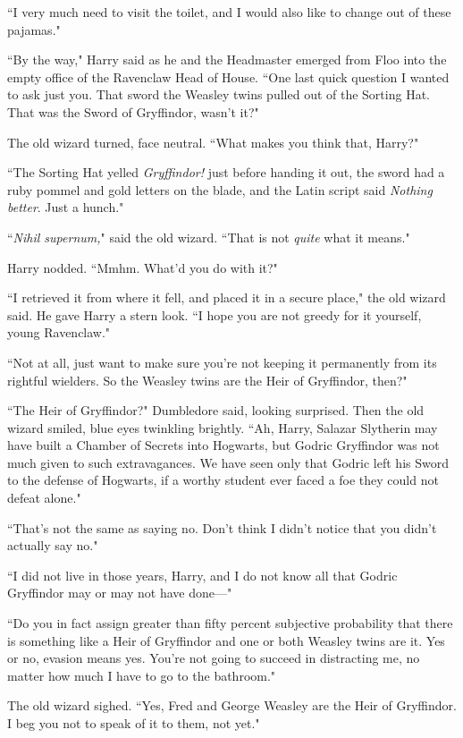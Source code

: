 ``I very much need to visit the toilet, and I would also like to change out of these pajamas."

\later

``By the way," Harry said as he and the Headmaster emerged from Floo into the empty office of the Ravenclaw Head of House. ``One last quick question I wanted to ask just you. That sword the Weasley twins pulled out of the Sorting Hat. That was the Sword of Gryffindor, wasn't it?"

The old wizard turned, face neutral. ``What makes you think that, Harry?"

``The Sorting Hat yelled \emph{Gryffindor!} just before handing it out, the sword had a ruby pommel and gold letters on the blade, and the Latin script said \emph{Nothing better}. Just a hunch."

``\emph{Nihil supernum,}" said the old wizard. ``That is not \emph{quite} what it means."

Harry nodded. ``Mmhm. What'd you do with it?"

``I retrieved it from where it fell, and placed it in a secure place," the old wizard said. He gave Harry a stern look. ``I hope you are not greedy for it yourself, young Ravenclaw."

``Not at all, just want to make sure you're not keeping it permanently from its rightful wielders. So the Weasley twins are the Heir of Gryffindor, then?"

``The Heir of Gryffindor?" Dumbledore said, looking surprised. Then the old wizard smiled, blue eyes twinkling brightly. ``Ah, Harry, Salazar Slytherin may have built a Chamber of Secrets into Hogwarts, but Godric Gryffindor was not much given to such extravagances. We have seen only that Godric left his Sword to the defense of Hogwarts, if a worthy student ever faced a foe they could not defeat alone."

``That's not the same as saying no. Don't think I didn't notice that you didn't actually say no."

``I did not live in those years, Harry, and I do not know all that Godric Gryffindor may or may not have done---"

``Do you in fact assign greater than fifty percent subjective probability that there is something like a Heir of Gryffindor and one or both Weasley twins are it. Yes or no, evasion means yes. You're not going to succeed in distracting me, no matter how much I have to go to the bathroom."

The old wizard sighed. ``Yes, Fred and George Weasley are the Heir of Gryffindor. I beg you not to speak of it to them, not yet."

